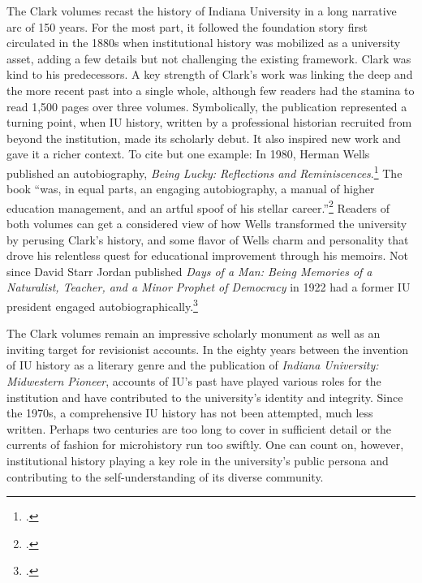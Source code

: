 \documentclass[
  american,
  letterpaper,
]{scrreprt}
\begin{document}
The Clark volumes recast the history of Indiana University in a long
narrative arc of 150 years. For the most part, it followed the
foundation story first circulated in the 1880s when institutional
history was mobilized as a university asset, adding a few details but
not challenging the existing framework. Clark was kind to his
predecessors. A key strength of Clark's work was linking the deep and
the more recent past into a single whole, although few readers had the
stamina to read 1,500 pages over three volumes. Symbolically, the
publication represented a turning point, when IU history, written by a
professional historian recruited from beyond the institution, made its
scholarly debut. It also inspired new work and gave it a richer context.
To cite but one example: In 1980, Herman Wells published an
autobiography, \emph{Being Lucky: Reflections and
Reminiscences}.\footnote{.} The book ``was, in equal parts, an
engaging autobiography, a manual of higher education management, and an
artful spoof of his stellar career.''\footnote{.} Readers of both volumes can get a
considered view of how Wells transformed the university by perusing
Clark's history, and some flavor of Wells charm and personality that
drove his relentless quest for educational improvement through his
memoirs. Not since David Starr Jordan published \emph{Days of a Man:
Being Memories of a Naturalist, Teacher, and a Minor Prophet of
Democracy} in 1922 had a former IU president engaged
autobiographically.\footnote{.}

The Clark volumes remain an impressive scholarly monument as well as an
inviting target for revisionist accounts. In the eighty years between
the invention of IU history as a literary genre and the publication of
\emph{Indiana University: Midwestern Pioneer}, accounts of IU's past
have played various roles for the institution and have contributed to
the university's identity and integrity. Since the 1970s, a
comprehensive IU history has not been attempted, much less written.
Perhaps two centuries are too long to cover in sufficient detail or the
currents of fashion for microhistory run too swiftly. One can count on,
however, institutional history playing a key role in the university's
public persona and contributing to the self-understanding of its diverse
community.
\end{document}
